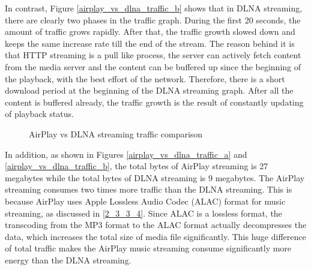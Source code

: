 In contrast, Figure \ref{airplay_vs_dlna_traffic_b} shows that in DLNA
streaming, there are clearly two phases in the traffic graph. During the first
20 seconds, the amount of traffic grows rapidly. After that, the traffic growth slowed down and
keeps the same increase rate till the end of the stream. The reason behind it
is that HTTP streaming is a pull like process, the server can actively fetch
content from the media server and the content can be buffered up since the
beginning of the playback, with the best effort of the network. Therefore,
there is a short download period at the beginning of the DLNA streaming graph.
After all the content is buffered already, the traffic growth is the result of
constantly updating of playback status.
\begin{figure}[hb]
\caption{AirPlay vs DLNA streaming traffic
comparison \label{airplay_vs_dlna_traffic}}
\end{figure}
\clearpage

In addition, as shown in Figures \ref{airplay_vs_dlna_traffic_a} and
\ref{airplay_vs_dlna_traffic_b}, the total bytes of AirPlay streaming is 27
megabytes while the total bytes of DLNA streaming is 9 megabytes. The
AirPlay streaming consumes two times more traffic than the DLNA streaming. This
is because AirPlay uses Apple Lossless Audio Codec (ALAC) format for music
streaming, as discussed in \ref{2_3_3_4}. Since ALAC is a lossless format, the
transcoding from the MP3 format to the ALAC format actually decompresses the
data, which increases the total size of media file significantly. This huge
difference of total traffic makes the AirPlay music streaming consume
significantly more energy than the DLNA streaming.

